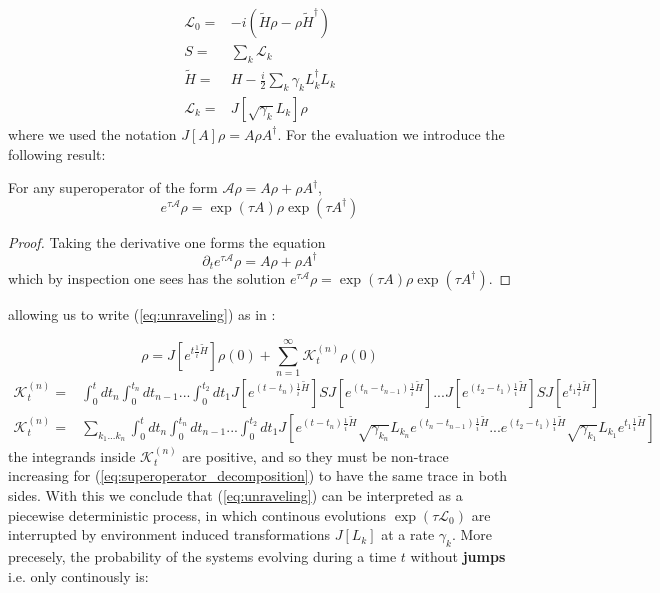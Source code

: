 \begin{align}
\mathcal{L}_{0} =& -i(\tilde{H}\rho - \rho\tilde{H}^{\dagger})\\
S =& \sum_{k}\mathcal{L}_{k}\\
  \tilde{H} =& H - \frac{i}{2}\sum_{k}\gamma_{k}L_{k}^{\dagger}L_{k}\\
  \mathcal{L}_{k} = & J[\sqrt{\gamma_{k}}L_{k}]\rho\
\end{align}
where we used the notation $J[A]\rho = A\rho A^{\dagger}$.
For the evaluation we introduce the following result:
\begin{lemma}
  For any superoperator of the form $\mathcal{A}\rho = A\rho+\rho A^{\dagger}$,
  \begin{equation}
    e^{\tau\mathcal{A}}\rho=\exp(\tau A)\rho\exp(\tau A^{\dagger})
  \end{equation}
\end{lemma}
  \begin{proof}
    Taking the derivative one forms the equation
    \begin{equation}
      \partial_{t}e^{\tau\mathcal{A}}\rho =  A\rho+\rho A^{\dagger}
    \end{equation}
    which by inspection one sees has the solution
    $e^{\tau\mathcal{A}}\rho=\exp(\tau A)\rho\exp(\tau A^{\dagger})$.
  \end{proof}
  allowing us to write (\ref{eq:unraveling}) as in \cite{wiseman_quantum_2010}:


  \begin{equation}\label{eq:superoperator_decomposition}
    \rho = J[e^{t \frac{1}{i}\tilde{H}}]\rho(0)  +  \sum_{n=1}^{\infty}\mathcal{K}^{(n)}_{t}\rho(0)
      \end{equation}
\begin{align}
  \mathcal{K}^{(n)}_{t}=&\int_{0}^{t}dt_{n}\int_{0}^{t_{n}}dt_{n-1}...\int_{0}^{t_{2}}dt_{1}J[e^{(t-t_{n}) \frac{1}{i}\tilde{H}}]SJ[e^{(t_{n}-t_{n-1}) \frac{1}{i}\tilde{H}}]...J[e^{(t_{2}-t_{1}) \frac{1}{i}\tilde{H}}]SJ[e^{t_{1}\frac{1}{i}\tilde{H}}]\\
  \mathcal{K}^{(n)}_{t}=&\sum_{k_{1}...k_{n}}\int_{0}^{t}dt_{n}\int_{0}^{t_{n}}dt_{n-1}...\int_{0}^{t_{2}}dt_{1}J\left[e^{(t-t_{n})\frac{1}{i}\tilde{H}}\sqrt{\gamma_{k_{n}}}L_{k_{n}}e^{(t_{n}-t_{n-1})\frac{1}{i}\tilde{H}}...e^{(t_{2}-t_{1})\frac{1}{i}\tilde{H}}\sqrt{\gamma_{k_{1}}}L_{k_{1}}e^{t_{1}\frac{1}{i}\tilde{H}}\right]
\end{align}
the integrands inside $\mathcal{K}_{t}^{(n)}$ are positive, and so they must be non-trace increasing for (\ref{eq:superoperator_decomposition})
to have the same trace in both sides. With this we conclude that (\ref{eq:unraveling}) can be interpreted as a piecewise deterministic process,
in which continous evolutions $\exp(\tau\mathcal{L}_{0})$ are interrupted by environment induced transformations $J[L_{k}]$ at a rate
$\gamma_{k}$. More precesely, the probability of the systems evolving during a time $t$ without \textbf{jumps} i.e. only continously is:

